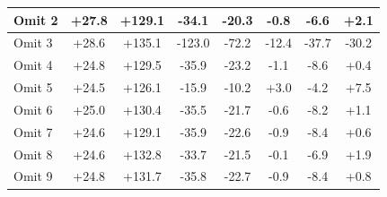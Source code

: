 \begin{table}[!h]
\begin{center}
\begin{tabular}[h]{|l||c|c|c|c|c|c||c|}
Omit 2& +27.8& +129.1& -34.1& -20.3& -0.8& -6.6& +2.1\\\hline
{\color{Gray}Omit 3}&{\color{Gray} +28.6}&{\color{Gray} +135.1}&{\color{Gray} -123.0}&{\color{Gray} -72.2}&{\color{Gray} -12.4}&{\color{Gray} -37.7}&{\color{Gray} -30.2}\\\hline
Omit 4& +24.8& +129.5& -35.9& -23.2& -1.1& -8.6& +0.4\\\hline
Omit 5& +24.5& +126.1& -15.9& -10.2& +3.0& -4.2& +7.5\\\hline
Omit 6& +25.0& +130.4& -35.5& -21.7& -0.6& -8.2& +1.1\\\hline
Omit 7& +24.6& +129.1& -35.9& -22.6& -0.9& -8.4& +0.6\\\hline
Omit 8& +24.6& +132.8& -33.7& -21.5& -0.1& -6.9& +1.9\\\hline
Omit 9& +24.8& +131.7& -35.8& -22.7& -0.9& -8.4& +0.8\\\hline
\end{tabular}
\end{center}
\label{tab:run2_ihwp_only_null_corrections_table}
\end{table}

